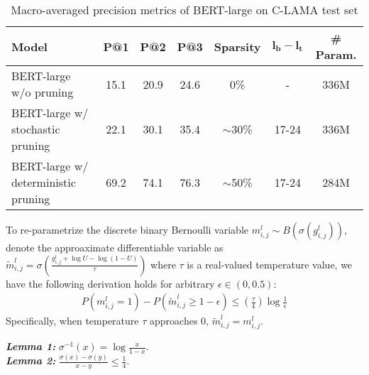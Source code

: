 \begin{table*}[tb!]
	\centering
	\footnotesize
	\begin{tabular}{l|ccc|c|c|c}
		\toprule
		\textbf{Model} & \textbf{P@1} & \textbf{P@2} & \textbf{P@3} & \textbf{Sparsity}  & $\bm{l_b-l_t}$ & \textbf{\# Param.}\\
		\midrule
		BERT-large w/o pruning &15.1  &20.9   &24.6  & 0\% & - &336M  \\
		BERT-large w/ stochastic pruning &22.1  &30.1   &35.4   & $\sim$30\% & 17-24 &336M \\
		BERT-large w/ deterministic pruning &69.2  &74.1   &76.3   & $\sim$50\% & 17-24 & 284M\\
		\bottomrule
	\end{tabular}
	\caption{Macro-averaged precision metrics of BERT-large on C-LAMA test set}
	\label{table:rank}
\end{table*}
\label{ap:derivation}
To re-parametrize the discrete binary Bernoulli variable $m_{i,j}^l\sim B(\sigma(g_{i,j}^l))$, denote the approaximate differentiable variable as $\tilde{m}_{i,j}^l=\sigma(\frac{g_{i,j}^l+\log{U}-\log{(1-U)}}{\tau})$ where $\tau$ is a real-valued temperature value, we have the following derivation holds for arbitrary $\epsilon \in (0, 0.5)$:
\begin{align}
	P(m_{i,j}^l=1) - P(\tilde{m}_{i,j}^l\geq 1-\epsilon) \leq (\frac{\tau}{4})\log{\frac{1}{\epsilon}}
\end{align}
Specifically, when temperature $\tau$ approaches $0$, $\tilde{m}_{i,j}^l = m_{i,j}^l$.

\noindent
\textit{\textbf{Lemma 1:}} $\sigma^{-1}(x)=\log{\frac{x}{1-x}}$.\\
\noindent
\textit{\textbf{Lemma 2:}} $\frac{\sigma(x)-\sigma(y)}{x-y} \leq \frac{1}{4}$.

